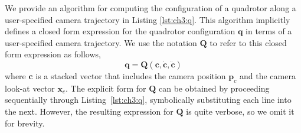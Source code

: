 \begin{Listing}[t]
\begin{algorithmic}[1]
{}


\end{algorithmic}
\end{Listing}

We provide an algorithm for computing the configuration of a quadrotor along a user-specified camera trajectory in Listing \ref{lst:ch3:q}.
This algorithm implicitly defines a closed form expression  for the quadrotor configuration $\mathbf{q}$ in terms of a user-specified camera trajectory.
We use the notation $\mathbf{Q}$ to refer to this closed form expression as follows,
%
\begin{equation}
\mathbf{q} = \mathbf{Q} (\mathbf{c},\dot{\mathbf{c}},\ddot{\mathbf{c}})
\label{eqn:ch3:q}
\end{equation}
%
where $\mathbf{c}$ is a stacked vector that includes the camera position $\mathbf{p}_c$ and the camera look-at vector $\mathbf{x}_c$.
The explicit form for $\mathbf{Q}$ can be obtained by proceeding sequentially through Listing~\ref{lst:ch3:q}, symbolically substituting each line into the next.
However, the resulting expression for $\mathbf{Q}$ is quite verbose, so we omit it for brevity.


